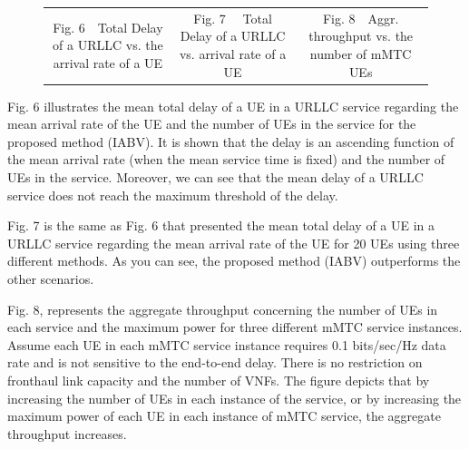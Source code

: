 \documentclass[lettersize,journal]{IEEEtran}
\begin{document}
\begin{figure}[!htb]
{\begin{tabular}{c@{}c@{}c}
			\scriptsize Fig. 6~~Total Delay of a URLLC vs. the arrival rate of a UE  & \scriptsize Fig. 7~~ Total Delay of a URLLC vs. arrival rate of a UE  & \scriptsize Fig. 8~~Aggr. throughput vs. the number of mMTC UEs
	\end{tabular}}
	\label{label}
\end{figure}

Fig. 6 illustrates the mean total delay of a UE in a URLLC service regarding the mean arrival rate of the UE and the number of UEs in the service for the proposed method (IABV).
It is shown that the delay is an ascending function of the mean arrival rate (when the mean service time is fixed) and the number of UEs in the service.
 Moreover, we can see that the mean delay of a URLLC service
does not reach the maximum threshold of the delay.

Fig. 7 is the same as Fig. 6 that presented the mean total delay of a UE in a URLLC service regarding the mean arrival rate of the UE for 20 UEs using three different methods. As you can see, the proposed method (IABV) outperforms the other scenarios.

Fig. 8, represents the aggregate throughput concerning the number of UEs in each service and the maximum power for three different mMTC service instances. 
Assume each UE in each mMTC service instance requires 0.1 bits/sec/Hz data rate and is not sensitive to the end-to-end delay. There is no restriction on fronthaul link capacity and the number of VNFs.
The figure depicts that by increasing the number of UEs in each instance of the service, or by increasing the maximum power of each UE in each instance of mMTC service, the aggregate throughput increases.
\end{document}
